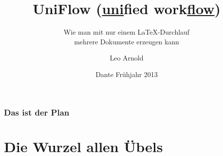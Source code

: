 \documentclass[]{beamer}
\begin{document}
\title{UniFlow (\underline{uni}fied work\underline{flow})}
\subtitle{Wie man mit nur einem \LaTeX{}-Durchlauf\\ mehrere Dokumente erzeugen kann}
\author{Leo Arnold}
\date{Dante Frühjahr 2013}

\begin{frame}
  \titlepage
\end{frame}

\begin{frame}
  \frametitle{Das ist der Plan}
  \tableofcontents[hideallsubsections]
\end{frame}

\section{Die Wurzel allen Übels}
\end{document}
